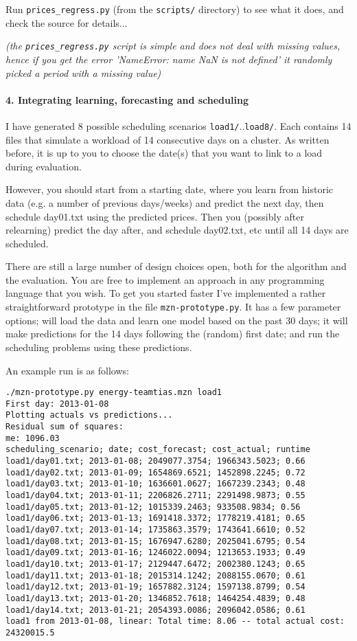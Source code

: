 \documentclass[a4,10pt]{article}
\begin{document}
Run \texttt{prices\_regress.py} (from the \texttt{scripts/} directory) to see what it does, and check the source for details...

\textit{(the \texttt{prices\_regress.py} script is simple and does not deal with missing values, hence if you get the error 'NameError: name NaN is not defined' it randomly picked a period with a missing value)}

\paragraph{4. Integrating learning, forecasting and scheduling}
I have generated 8 possible scheduling scenarios \texttt{load1/}..\texttt{load8/}. Each contains 14 files that simulate a workload of 14 consecutive days on a cluster. As written before, it is up to you to choose the date(s) that you want to link to a load during evaluation.

However, you should start from a starting date, where you learn from historic data (e.g. a number of previous days/weeks) and predict the next day, then schedule day01.txt using the predicted prices. Then you (possibly after relearning) predict the day after, and schedule day02.txt, etc until all 14 days are scheduled.

There are still a large number of design choices open, both for the algorithm and the evaluation. You are free to implement an approach in any programming language that you wish. To get you started faster I've implemented a rather straightforward prototype in the file \texttt{mzn-prototype.py}. It has a few parameter options; will load the data and learn one model based on the past 30 days; it will make predictions for the 14 days following the (random) first date; and run the scheduling problems using these predictions.

An example run is as follows:
\begin{verbatim}
./mzn-prototype.py energy-teamtias.mzn load1          
First day: 2013-01-08
Plotting actuals vs predictions...
Residual sum of squares:
me: 1096.03
scheduling_scenario; date; cost_forecast; cost_actual; runtime
load1/day01.txt; 2013-01-08; 2049077.3754; 1966343.5023; 0.66
load1/day02.txt; 2013-01-09; 1654869.6521; 1452898.2245; 0.72
load1/day03.txt; 2013-01-10; 1636601.0627; 1667239.2343; 0.48
load1/day04.txt; 2013-01-11; 2206826.2711; 2291498.9873; 0.55
load1/day05.txt; 2013-01-12; 1015339.2463; 933508.9834; 0.56
load1/day06.txt; 2013-01-13; 1691418.3372; 1778219.4181; 0.65
load1/day07.txt; 2013-01-14; 1735863.3579; 1743641.6610; 0.52
load1/day08.txt; 2013-01-15; 1676947.6280; 2025041.6795; 0.54
load1/day09.txt; 2013-01-16; 1246022.0094; 1213653.1933; 0.49
load1/day10.txt; 2013-01-17; 2129447.6472; 2002380.1243; 0.65
load1/day11.txt; 2013-01-18; 2015314.1242; 2088155.0670; 0.61
load1/day12.txt; 2013-01-19; 1657882.3124; 1597138.8799; 0.54
load1/day13.txt; 2013-01-20; 1346852.7618; 1464254.4839; 0.48
load1/day14.txt; 2013-01-21; 2054393.0086; 2096042.0586; 0.61
load1 from 2013-01-08, linear: Total time: 8.06 -- total actual cost: 24320015.5
\end{verbatim}
\end{document}
